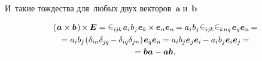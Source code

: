 \begin{otherlanguage}{russian}

\vspace{-0.15em} \noindent И~такие тождества для~любых двух векторов~$\bm{a}$ и~$\bm{b}$

\nopagebreak\vspace{-0.3em}
\begin{multline}\label{vectorcrossvectorcrossidentity}
\left(\hspace{.1ex} \bm{a} \times \bm{b} \hspace{.2ex}\right) \hspace{-0.2ex} \times \hspace{-0.1ex} \bm{E}
= \levicivita_{i\hspace{-0.1ex}j\hspace{-0.1ex}k} \hspace{.2ex} a_i \hspace{.1ex} b_j \hspace{.1ex} \bm{e}_k \hspace{-0.16ex} \times \hspace{-0.1ex} \bm{e}_n \bm{e}_n \hspace{-0.2ex}
= a_i \hspace{.1ex} b_j \hspace{.1ex} \levicivita_{i\hspace{-0.1ex}j\hspace{-0.1ex}k} \levicivita_{knq} \hspace{.2ex} \bm{e}_q \bm{e}_n \hspace{-0.2ex} =
\\
%
= a_i b_j \hspace{-0.2ex} \left( \delta_{in} \delta_{j\hspace{-0.1ex}q} \hspace{-0.2ex} - \delta_{iq} \delta_{jn} \right) \hspace{-0.2ex} \bm{e}_q \bm{e}_n \hspace{-0.2ex}
= a_i b_j \bm{e}_j \bm{e}_i \hspace{-0.12ex} - a_i b_j \bm{e}_i \bm{e}_j \hspace{-0.16ex} =
\\[-0.08em]
%
= \bm{b} \bm{a} - \bm{a} \bm{b}
\hspace{.2ex},
\end{multline}


\end{otherlanguage}
